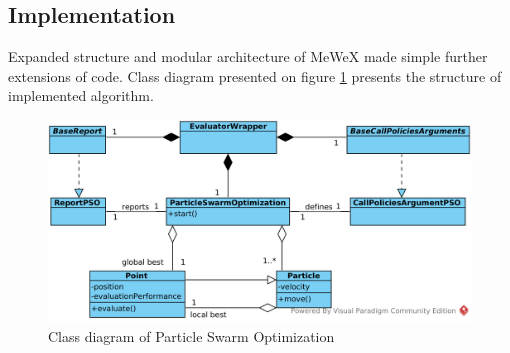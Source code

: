 \subsection{Implementation}
Expanded structure and modular architecture of MeWeX made simple further extensions of code. Class diagram presented on figure \ref{img_pso_class}
presents the structure of implemented algorithm.
\begin{figure}[ht]
\centering
    \includegraphics[scale=0.5]{img/pso_class.png}
    \caption{Class diagram of Particle Swarm Optimization}
    \label{img_pso_class}
\end{figure}


